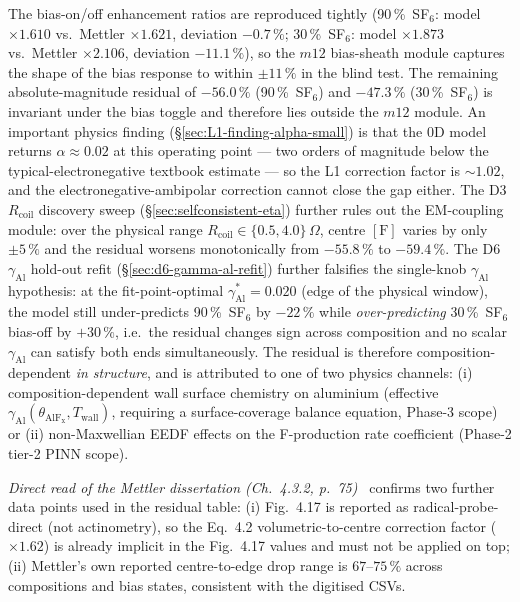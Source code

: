 \documentclass[11pt,a4paper]{report}
\begin{document}
The bias-on/off enhancement ratios are reproduced tightly (90\,\%~SF$_6$: model $\times 1.610$ vs.~Mettler $\times 1.621$, deviation $-0.7\,\%$; 30\,\%~SF$_6$: model $\times 1.873$ vs.~Mettler $\times 2.106$, deviation $-11.1\,\%$), so the $m12$ bias-sheath module captures the shape of the bias response to within $\pm 11\,\%$ in the blind test.  The remaining absolute-magnitude residual of $-56.0\,\%$ (90\,\%~SF$_6$) and $-47.3\,\%$ (30\,\%~SF$_6$) is invariant under the bias toggle and therefore lies outside the $m12$ module.  An important physics finding (\S\ref{sec:L1-finding-alpha-small}) is that the 0D model returns $\alpha \approx 0.02$ at this operating point --- two orders of magnitude below the typical-electronegative textbook estimate --- so the L1 correction factor is $\sim 1.02$, and the electronegative-ambipolar correction cannot close the gap either.  The D3 $R_\mathrm{coil}$ discovery sweep (\S\ref{sec:selfconsistent-eta}) further rules out the EM-coupling module: over the physical range $R_\mathrm{coil} \in \{0.5, 4.0\}\,\Omega$, centre $[\mathrm{F}]$ varies by only $\pm 5\,\%$ and the residual worsens monotonically from $-55.8\,\%$ to $-59.4\,\%$.  The D6 $\gamma_\mathrm{Al}$ hold-out refit (\S\ref{sec:d6-gamma-al-refit}) further falsifies the single-knob $\gamma_\mathrm{Al}$ hypothesis: at the fit-point-optimal $\gamma_\mathrm{Al}^{*}=0.020$ (edge of the physical window), the model still under-predicts 90\,\%~SF$_6$ by $-22\,\%$ while \emph{over-predicting} 30\,\%~SF$_6$ bias-off by $+30\,\%$, i.e.~the residual changes sign across composition and no scalar $\gamma_\mathrm{Al}$ can satisfy both ends simultaneously.  The residual is therefore composition-dependent \emph{in structure}, and is attributed to one of two physics channels: (i) composition-dependent wall surface chemistry on aluminium (effective $\gamma_\mathrm{Al}(\theta_\mathrm{AlF_x}, T_\mathrm{wall})$, requiring a surface-coverage balance equation, Phase-3 scope) or (ii) non-Maxwellian EEDF effects on the F-production rate coefficient (Phase-2 tier-2 PINN scope).

\emph{Direct read of the Mettler dissertation (Ch.~4.3.2, p.~75)~\cite{Mettler2025}} confirms two further data points used in the residual table: (i) Fig.~4.17 is reported as radical-probe-direct (not actinometry), so the Eq.~4.2 volumetric-to-centre correction factor ($\times 1.62$) is already implicit in the Fig.~4.17 values and must not be applied on top; (ii) Mettler's own reported centre-to-edge drop range is $67$--$75\,\%$ across compositions and bias states, consistent with the digitised CSVs.
\end{document}
